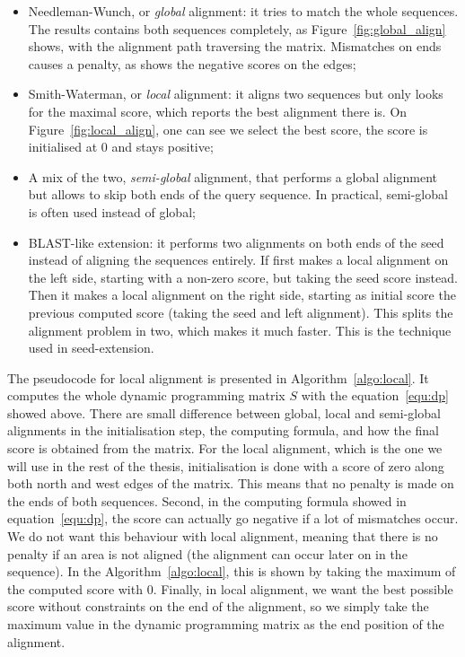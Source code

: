 \begin{itemize}
	\item Needleman-Wunch, or \emph{global} alignment: it tries to match the whole sequences. The results contains both sequences completely, as Figure~\ref{fig:global_align} shows, with the alignment path traversing the matrix. Mismatches on ends causes a penalty, as shows the negative scores on the edges;
	\item Smith-Waterman, or \emph{local} alignment: it aligns two sequences but only looks for the maximal score, which reports the best alignment there is. On Figure~\ref{fig:local_align}, one can see we select the best score, the score is initialised at 0 and stays positive;
	\item A mix of the two, \emph{semi-global} alignment, that performs a global alignment but allows to skip both ends of the query sequence. In practical, semi-global is often used instead of global;
	\item BLAST-like extension: it performs two alignments on both ends of the seed instead of aligning the sequences entirely. If first makes a local alignment on the left side, starting with a non-zero score, but taking the seed score instead. Then it makes a local alignment on the right side, starting as initial score the previous computed score (taking the seed and left alignment). This splits the alignment problem in two, which makes it much faster. This is the technique used in seed-extension.
\end{itemize}

The pseudocode for local alignment is presented in Algorithm~\ref{algo:local}. It computes the whole dynamic programming matrix $S$ with the equation~\ref{equ:dp} showed above. There are small difference between global, local and semi-global alignments in the initialisation step, the computing formula, and how the final score is obtained from the matrix. For the local alignment, which is the one we will use in the rest of the thesis, initialisation is done with a score of zero along both north and west edges of the matrix. This means that no penalty is made on the ends of both sequences. Second, in the computing formula showed in equation~\ref{equ:dp}, the score can actually go negative if a lot of mismatches occur. We do not want this behaviour with local alignment, meaning that there is no penalty if an area is not aligned (the alignment can occur later on in the sequence). In the Algorithm~\ref{algo:local}, this is shown by taking the maximum of the computed score with 0. Finally, in local alignment, we want the best possible score without constraints on the end of the alignment, so we simply take the maximum value in the dynamic programming matrix as the end position of the alignment.

